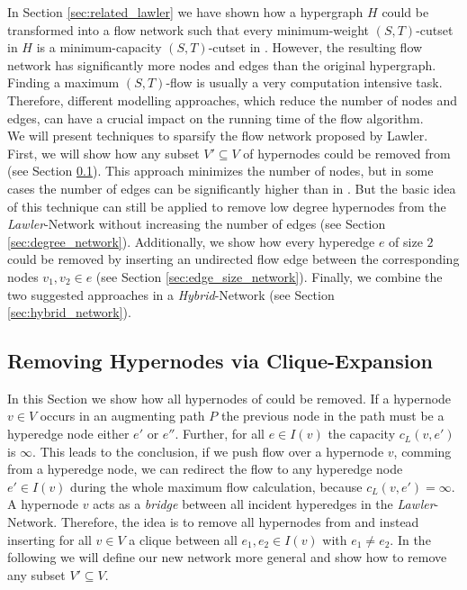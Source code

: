 
In Section \ref{sec:related_lawler} we have shown how a hypergraph $H$ could be transformed into 
a flow network  such that every minimum-weight $(S,T)$-cutset in $H$ is a
minimum-capacity $(S,T)$-cutset in  \cite{lawler1973}. However, the resulting flow
network has significantly more nodes and edges than the original hypergraph. Finding a
maximum $(S,T)$-flow is usually a very computation intensive task. 
Therefore, different modelling approaches, which reduce the number of nodes and edges,
can have a crucial impact on the running time of the flow algorithm. \\
We will present techniques to sparsify the flow network 
proposed by Lawler. First, we will show how any subset $V' \subseteq V$ of hypernodes could be removed 
from  (see Section \ref{sec:heuer_network}). This approach minimizes
the number of nodes, but in some cases the number of edges can be
significantly higher than in . But the basic idea of this technique 
can still be applied to remove low degree hypernodes from the \emph{Lawler}-Network without 
increasing the number of edges (see Section \ref{sec:degree_network}). Additionally, we show
how every hyperedge $e$ of size $2$ could be removed by inserting an undirected flow edge between
the corresponding nodes $v_1,v_2 \in e$  (see Section \ref{sec:edge_size_network}). 
Finally, we combine the two suggested approaches in a \emph{Hybrid}-Network 
(see Section \ref{sec:hybrid_network}).



\subsection{Removing Hypernodes via Clique-Expansion}
\label{sec:heuer_network}

In this Section we show how all hypernodes of  could be removed. If a hypernode $v \in V$
occurs in an augmenting path $P$ the previous node in the path must be a hyperedge node either
$e'$ or $e''$. Further, for all $e \in I(v)$ the capacity $c_L(v,e')$ is $\infty$. This leads to
the conclusion, if we push flow over a hypernode $v$, comming from a hyperedge node, we can redirect
the flow to any hyperedge node $e' \in I(v)$ during the whole maximum flow calculation, because 
$c_L(v,e') = \infty$. A hypernode $v$ acts as a \emph{bridge} between all incident hyperedges in the 
\emph{Lawler}-Network. Therefore, the idea is to remove all hypernodes from  and instead
inserting for all $v \in V$ a clique between all $e_1, e_2 \in I(v)$ with $e_1 \neq e_2$.
In the following we will define our new network more general and show how to remove
any subset $V' \subseteq V$.


